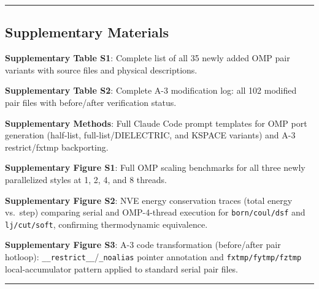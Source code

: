 \documentclass[
  11pt,
]{article}
\begin{document}
\begin{center}\rule{0.5\linewidth}{0.5pt}\end{center}

\subsection{Supplementary Materials}\label{supplementary-materials}

\textbf{Supplementary Table S1}: Complete list of all 35 newly added OMP
pair variants with source files and physical descriptions.

\textbf{Supplementary Table S2}: Complete A-3 modification log: all 102
modified pair files with before/after verification status.

\textbf{Supplementary Methods}: Full Claude Code prompt templates for
OMP port generation (half-list, full-list/DIELECTRIC, and KSPACE
variants) and A-3 restrict/fxtmp backporting.

\textbf{Supplementary Figure S1}: Full OMP scaling benchmarks for all
three newly parallelized styles at 1, 2, 4, and 8 threads.

\textbf{Supplementary Figure S2}: NVE energy conservation traces (total
energy vs.~step) comparing serial and OMP-4-thread execution for
\texttt{born/coul/dsf} and \texttt{lj/cut/soft}, confirming
thermodynamic equivalence.

\textbf{Supplementary Figure S3}: A-3 code transformation (before/after
pair hotloop): \texttt{\_\_restrict\_\_}/\texttt{\_noalias} pointer
annotation and \texttt{fxtmp/fytmp/fztmp} local-accumulator pattern
applied to standard serial pair files.

\begin{center}\rule{0.5\linewidth}{0.5pt}\end{center}
\end{document}
